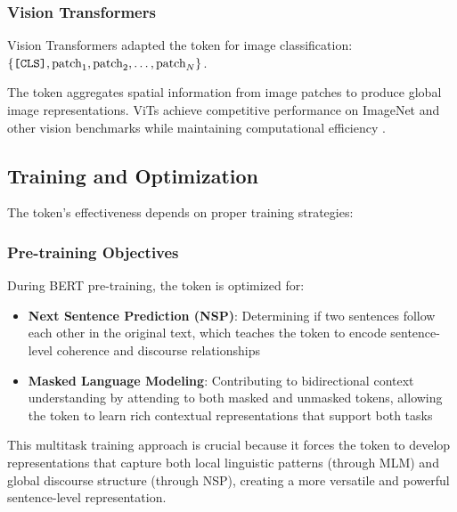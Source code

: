\subsubsection{Vision Transformers}
Vision Transformers \citep{dosovitskiy2020image} adapted the \cls{} token for image classification:\\
$\{\texttt{[CLS]}{}, \text{patch}_1, \text{patch}_2, \ldots, \text{patch}_N\}$.

The \cls{} token aggregates spatial information from image patches to produce global image representations. ViTs achieve competitive performance on ImageNet \citep{russakovsky2015imagenet, deng2009imagenet} and other vision benchmarks while maintaining computational efficiency \citep{strubell2019energy}.

\subsection{Training and Optimization}

The \cls{} token's effectiveness depends on proper training strategies:

\subsubsection{Pre-training Objectives}
During BERT pre-training, the \cls{} token is optimized for:
\begin{itemize}
\item \textbf{Next Sentence Prediction (NSP)}: Determining if two sentences follow each other in the original text, which teaches the \cls{} token to encode sentence-level coherence and discourse relationships
\item \textbf{Masked Language Modeling}: Contributing to bidirectional context understanding by attending to both masked and unmasked tokens, allowing the \cls{} token to learn rich contextual representations that support both tasks
\end{itemize}

This multitask training approach is crucial because it forces the \cls{} token to develop representations that capture both local linguistic patterns (through MLM) and global discourse structure (through NSP), creating a more versatile and powerful sentence-level representation.

\begin{comment}
Feedback: Convert the above into latex items, with a little elaboration on how this multitask training helps CLS embedding.

STATUS: addressed - converted to LaTeX items with elaboration on how multitask training benefits CLS embeddings
\end{comment}

